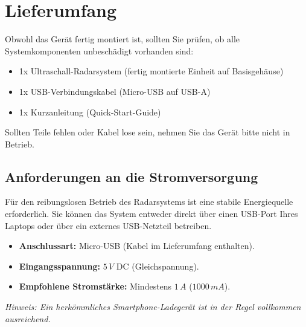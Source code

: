 %
%

\chapter{Lieferumfang}
Obwohl das Gerät fertig montiert ist, sollten Sie prüfen, ob alle Systemkomponenten unbeschädigt vorhanden sind:

\begin{itemize}
	\item 1x Ultraschall-Radarsystem (fertig montierte Einheit auf Basisgehäuse)
	\item 1x USB-Verbindungskabel (Micro-USB auf USB-A)
	\item 1x Kurzanleitung (Quick-Start-Guide)
\end{itemize}
Sollten Teile fehlen oder Kabel lose sein, nehmen Sie das Gerät bitte nicht in Betrieb.

\section{Anforderungen an die Stromversorgung}
Für den reibungslosen Betrieb des Radarsystems ist eine stabile Energiequelle erforderlich. Sie können das System entweder direkt über einen USB-Port Ihres Laptops oder über ein externes USB-Netzteil betreiben.

\begin{itemize}
	\item \textbf{Anschlussart:} Micro-USB (Kabel im Lieferumfang enthalten).
	\item \textbf{Eingangsspannung:} $5\,V$ DC (Gleichspannung).
	\item \textbf{Empfohlene Stromstärke:} Mindestens $1\,A$ ($1000\,mA$).
\end{itemize}
\textit{Hinweis: Ein herkömmliches Smartphone-Ladegerät ist in der Regel vollkommen ausreichend.}